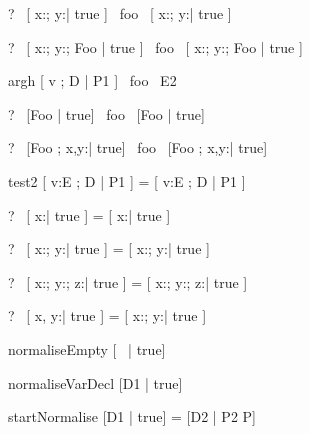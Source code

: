 \begin{zed}
  \vdash?~ [ x:\nat; y:\nat | true ] ~foo~ [ x:\nat; y:\nat | true ]
\end{zed}

\begin{zed}
  \vdash?~ [ x:\nat; y:\nat ; Foo | true ] ~foo~
           [ x:\nat; y:\nat ; Foo | true ]
\end{zed}


\begin{zedrule}{argh}
  [ v ; D | P1 ] ~foo~ E2
\end{zedrule}

\begin{zed}
  \vdash?~ [Foo | true] ~foo~ [Foo | true]
\end{zed}

\begin{zed}
  \vdash?~ [Foo ; x,y:\nat | true] ~foo~ [Foo ; x,y:\nat | true]
\end{zed}

\begin{zedrule}{test2}
  [ v:E ; D | P1 ] = [ v:E ; D | P1 ]
\end{zedrule}

\begin{zed}
  \vdash?~ [ x:\nat | true ] = [ x:\nat | true ]
\end{zed}

\begin{zed}
  \vdash?~ [ x:\nat; y:\nat | true ] = [ x:\nat; y:\nat | true ]
\end{zed}

\begin{zed}
  \vdash?~ [ x:\nat; y:\nat ; z:\nat | true ] =
           [ x:\nat; y:\nat ; z:\nat | true ]
\end{zed}

\begin{zed}
  \vdash?~ [ x, y:\nat | true ] = [ x:\nat; y:\nat | true ]
\end{zed}


\begin{zedrule}{normaliseEmpty}
   [~ | true] \unfoldsTo [~ | true]
\end{zedrule}

\begin{zedrule}{normaliseVarDecl}
   [D1 | true] \unfoldsTo [D2 | P2]
\derives
   [v:E; D1 | true] \unfoldsTo [v:E; D2 | P2]
\end{zedrule}

\begin{zedrule}{startNormalise}
   [D1 | true] \unfoldsTo [D2 | P2]
\derives
   [D1 | P] = [D2 | P2 \land P]
\end{zedrule}

